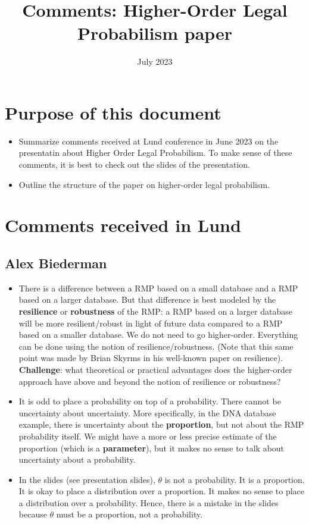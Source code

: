 \documentclass[
  10pt,
  dvipsnames,enabledeprecatedfontcommands]{scrartcl}
\title{Comments: Higher-Order Legal Probabilism paper}
\author{}
\date{\vspace{-2.5em}July 2023}
\begin{document}
\maketitle

\hypertarget{purpose-of-this-document}{%
\section{Purpose of this document}\label{purpose-of-this-document}}

\begin{itemize}
\item
  Summarize comments received at Lund conference in June 2023 on the
  presentatin about Higher Order Legal Probabilism. To make sense of
  these comments, it is best to check out the slides of the
  presentation.
\item
  Outline the structure of the paper on higher-order legal probabilism.
\end{itemize}

\hypertarget{comments-received-in-lund}{%
\section{Comments received in Lund}\label{comments-received-in-lund}}

\hypertarget{alex-biederman}{%
\subsection{Alex Biederman}\label{alex-biederman}}

\begin{itemize}
\item
  There is a difference between a RMP based on a small database and a
  RMP based on a larger database. But that difference is best modeled by
  the \textbf{resilience} or \textbf{robustness} of the RMP: a RMP based
  on a larger database will be more resilient/robust in light of future
  data compared to a RMP based on a smaller database. We do not need to
  go higher-order. Everything can be done using the notion of
  resilience/robustness. (Note that this same point was made by Brian
  Skyrms in his well-known paper on resilience). \textbf{Challenge}:
  what theoretical or practical advantages does the higher-order
  approach have above and beyond the notion of resilience or robustness?
\item
  It is odd to place a probability on top of a probability. There cannot
  be uncertainty about uncertainty. More specifically, in the DNA
  database example, there is uncertainty about the \textbf{proportion},
  but not about the RMP probability itself. We might have a more or less
  precise estimate of the proportion (which is a \textbf{parameter}),
  but it makes no sense to talk about uncertainty about a probability.
\item
  In the slides (see presentation slides), \(\theta\) is not a
  probability. It is a proportion. It is okay to place a distribution
  over a proportion. It makes no sense to place a distribution over a
  probability. Hence, there is a mistake in the slides because
  \(\theta\) must be a proportion, not a probability.
\end{itemize}
\end{document}
